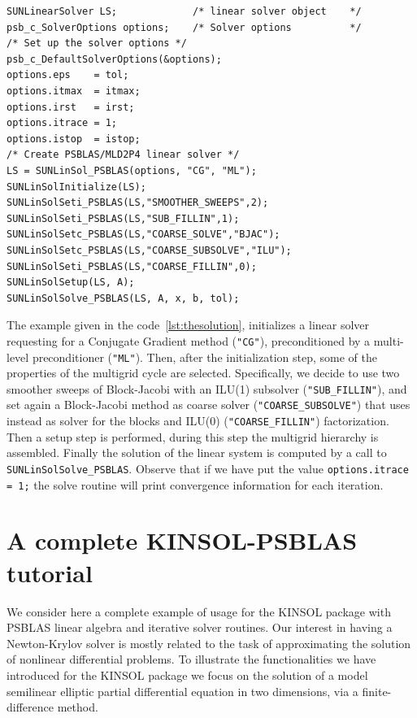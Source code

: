 \documentclass[twoside,a4paper]{refart}
\theoremstyle{definition}
\begin{document}
\begin{lstlisting}[style=CStyle,caption="An example of solution with PCG preconditioned by a ML preconditioner",label=lst:thesolution]
SUNLinearSolver LS;             /* linear solver object    */
psb_c_SolverOptions options;    /* Solver options          */
/* Set up the solver options */
psb_c_DefaultSolverOptions(&options);
options.eps    = tol;
options.itmax  = itmax;
options.irst   = irst;
options.itrace = 1;
options.istop  = istop;
/* Create PSBLAS/MLD2P4 linear solver */
LS = SUNLinSol_PSBLAS(options, "CG", "ML");
SUNLinSolInitialize(LS);
SUNLinSolSeti_PSBLAS(LS,"SMOOTHER_SWEEPS",2);
SUNLinSolSeti_PSBLAS(LS,"SUB_FILLIN",1);
SUNLinSolSetc_PSBLAS(LS,"COARSE_SOLVE","BJAC");
SUNLinSolSetc_PSBLAS(LS,"COARSE_SUBSOLVE","ILU");
SUNLinSolSeti_PSBLAS(LS,"COARSE_FILLIN",0);
SUNLinSolSetup(LS, A);
SUNLinSolSolve_PSBLAS(LS, A, x, b, tol);
\end{lstlisting}

The example given in the code~\ref{lst:thesolution}, initializes a linear solver requesting for a Conjugate Gradient method (\lstinline[style=CStyle]|"CG"|), preconditioned by a multi-level preconditioner (\lstinline[style=CStyle]|"ML"|). Then, after the initialization step, some of the properties of the multigrid cycle are selected. Specifically, we decide to use two smoother sweeps of Block-Jacobi with an ILU(1) subsolver (\lstinline[style=CStyle]|"SUB_FILLIN"|), and set again a Block-Jacobi method as coarse solver (\lstinline[style=CStyle]|"COARSE_SUBSOLVE"|) that uses instead as solver for the blocks and ILU(0) (\lstinline[style=CStyle]|"COARSE_FILLIN"|) factorization. Then a setup step is performed, during this step the multigrid hierarchy is assembled. Finally the solution of the linear system is computed by a call to \lstinline[style=CStyle]|SUNLinSolSolve_PSBLAS|. Observe that if we have put the value \lstinline[style=CStyle]|options.itrace = 1;| the solve routine will print convergence information for each iteration.

\section{A complete KINSOL-PSBLAS tutorial}

We consider here a complete example of usage for the KINSOL package with PSBLAS linear algebra and iterative solver routines. Our interest in having a Newton-Krylov solver is mostly related to the task of approximating the solution of nonlinear differential problems. To illustrate the functionalities we have introduced for the KINSOL package we focus on the solution of a model semilinear elliptic partial differential equation in two dimensions, via a finite-difference method.
\end{document}
